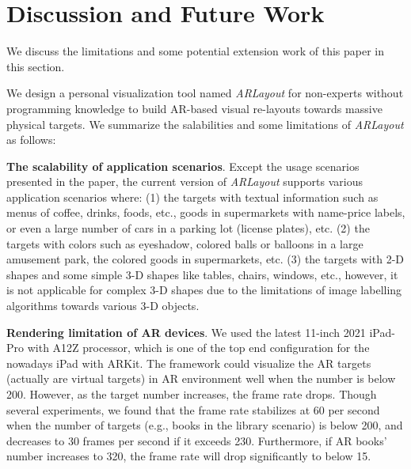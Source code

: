 \section{Discussion and Future Work}
\label{sec:discussion}

We discuss the limitations and some potential extension work of this paper
in this section.


We design a personal visualization tool named \textit{ARLayout}
for non-experts without programming knowledge
to build AR-based visual re-layouts towards massive physical targets.
We summarize the salabilities and some limitations of \textit{ARLayout} as follows:

\textbf{The scalability of application scenarios}. Except the usage scenarios presented in the paper,
the current version of \textit{ARLayout} supports various application scenarios where:
(1) the targets with textual information such as menus of coffee, drinks, foods, etc.,
goods in supermarkets with name-price labels,
or even a large number of cars in a parking lot (license plates), etc.
(2) the targets with colors such as eyeshadow,
colored balls or balloons in a large amusement park,
the colored goods in supermarkets, etc.
(3) the targets with 2-D shapes and some simple 3-D shapes like tables, chairs, windows, etc., 
however, it is not applicable for complex 3-D shapes due to
the limitations of image labelling algorithms towards various 3-D objects. 

\textbf{Rendering limitation of AR devices}.
We used the latest 11-inch 2021 iPad-Pro with A12Z processor,
which is one of the top end configuration for the nowadays iPad with ARKit.
The framework could visualize the AR targets (actually are virtual targets)
in AR environment well when the number is below 200.
However, as the target number increases, the frame rate drops.
Though several experiments, we found that the frame rate stabilizes at 60 per second
when the number of targets (e.g., books in the library scenario) is below 200, and decreases to 30 frames per second
if it exceeds 230. Furthermore, if AR books' number increases to 320, the frame rate
will drop significantly to below 15.

